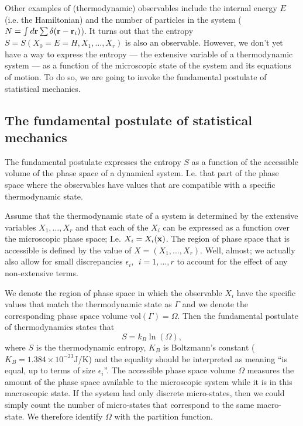 \documentclass{article}
\begin{document}
Other examples of (thermodynamic) observables include the internal energy $E$ (i.e. the Hamiltonian) and the number of particles in the system ($N = \int d{\bf r}\sum\delta({\bf r}-{\bf r}_i)$).
It turns out that the entropy $S=S(X_0=E=H,X_1,\ldots,X_r)$ is also an observable. However, we don't yet have a way to express the entropy --- the extensive variable of a thermodynamic system --- as a function of the microscopic state of the system and its equations of motion. To do so, we are going to invoke the fundamental postulate of statistical mechanics.

\subsection*{The fundamental postulate of statistical mechanics}
The fundamental postulate expresses the entropy $S$ as a function of the accessible volume of the phase space of a dynamical system. I.e. that part of the phase space where the observables have values that are compatible with a specific thermodynamic state.

Assume that the thermodynamic state of a system is determined by the extensive variables $X_1,\ldots,X_r$ and that each of the $X_i$ can be expressed as a function over the microscopic phase space; I.e. $X_i = X_i({\bf x})$.
The region of phase space that is accessible is defined by the value of $X = (X_1,\ldots,X_r)$. Well, almost; we actually also allow for small discrepancies $\epsilon_i,~~i=1,\ldots,r$ to account for the effect of any non-extensive terms.

We denote the region of phase space in which the observable $X_i$ have the specific values that match the thermodynamic state as $\Gamma$ and we denote the corresponding phase space volume $\text{vol}(\Gamma)=\Omega$. Then the fundamental postulate of thermodynamics states that
\begin{equation}
	S = k_B\ln(\Omega),
	\label{eqS}
\end{equation}
where $S$ is the thermodynamic entropy, $K_B$ is Boltzmann's constant ($K_B = 1.384\times10^{-23}$J/K) and the equality should be interpreted as meaning ``is equal, up to terms of size $\epsilon_i$''. The accessible phase space volume $\Omega$ measures the amount of the phase space available to the microscopic system while it is in this macroscopic state. If the system had only discrete micro-states, then we could simply count the number of micro-states that correspond to the same macro-state. We therefore identify $\Omega$ with the partition function.
\end{document}
